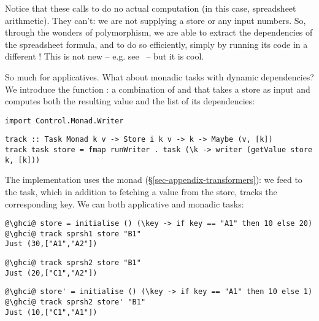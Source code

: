 \noindent
Notice that these calls to  do no actual computation
(in this case, spreadsheet arithmetic). They can't:
we are not supplying a store or any input numbers.
So, through the wonders of polymorphism, we are able to extract the
dependencies of the spreadsheet formula, and to do so efficiently,
simply by running its code in a different !
This is not new -- e.g. see~\cite{free-applicatives} -- but it is cool.

So much for applicatives.  What about monadic tasks with dynamic dependencies?
We introduce the function :
a combination of  and  that takes a store as input
and computes both the resulting value and the list of its dependencies:

\vspace{1mm}
\begin{verbatim}
import Control.Monad.Writer
\end{verbatim}
\vspace{0.5mm}
\begin{verbatim}
track :: Task Monad k v -> Store i k v -> k -> Maybe (v, [k])
track task store = fmap runWriter . task (\k -> writer (getValue store k, [k]))
\end{verbatim}
\vspace{1mm}

The implementation uses the  monad (\S\ref{sec-appendix-transformers}):
we feed  to the task, which in
addition to fetching a value from the store, tracks the corresponding key. We
can  both applicative and monadic tasks:

\vspace{1mm}
\begin{verbatim}
@\ghci@ store = initialise () (\key -> if key == "A1" then 10 else 20)
@\ghci@ track sprsh1 store "B1"
Just (30,["A1","A2"])
\end{verbatim}
\vspace{1mm}
\begin{verbatim}
@\ghci@ track sprsh2 store "B1"
Just (20,["C1","A2"])
\end{verbatim}
\vspace{1mm}
\begin{verbatim}
@\ghci@ store' = initialise () (\key -> if key == "A1" then 10 else 1)
@\ghci@ track sprsh2 store' "B1"
Just (10,["C1","A1"])
\end{verbatim}
\vspace{1mm}

